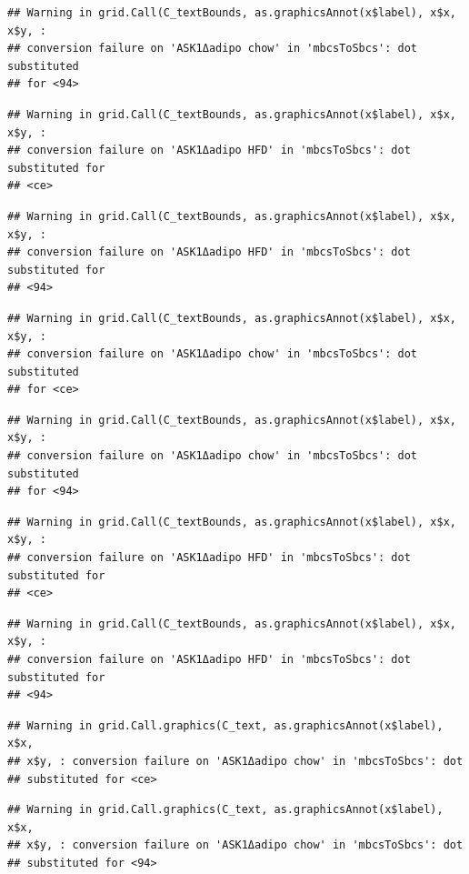 \documentclass[]{book}
\begin{document}
\begin{verbatim}
## Warning in grid.Call(C_textBounds, as.graphicsAnnot(x$label), x$x, x$y, :
## conversion failure on 'ASK1Δadipo chow' in 'mbcsToSbcs': dot substituted
## for <94>
\end{verbatim}

\begin{verbatim}
## Warning in grid.Call(C_textBounds, as.graphicsAnnot(x$label), x$x, x$y, :
## conversion failure on 'ASK1Δadipo HFD' in 'mbcsToSbcs': dot substituted for
## <ce>
\end{verbatim}

\begin{verbatim}
## Warning in grid.Call(C_textBounds, as.graphicsAnnot(x$label), x$x, x$y, :
## conversion failure on 'ASK1Δadipo HFD' in 'mbcsToSbcs': dot substituted for
## <94>
\end{verbatim}

\begin{verbatim}
## Warning in grid.Call(C_textBounds, as.graphicsAnnot(x$label), x$x, x$y, :
## conversion failure on 'ASK1Δadipo chow' in 'mbcsToSbcs': dot substituted
## for <ce>
\end{verbatim}

\begin{verbatim}
## Warning in grid.Call(C_textBounds, as.graphicsAnnot(x$label), x$x, x$y, :
## conversion failure on 'ASK1Δadipo chow' in 'mbcsToSbcs': dot substituted
## for <94>
\end{verbatim}

\begin{verbatim}
## Warning in grid.Call(C_textBounds, as.graphicsAnnot(x$label), x$x, x$y, :
## conversion failure on 'ASK1Δadipo HFD' in 'mbcsToSbcs': dot substituted for
## <ce>
\end{verbatim}

\begin{verbatim}
## Warning in grid.Call(C_textBounds, as.graphicsAnnot(x$label), x$x, x$y, :
## conversion failure on 'ASK1Δadipo HFD' in 'mbcsToSbcs': dot substituted for
## <94>
\end{verbatim}

\begin{verbatim}
## Warning in grid.Call.graphics(C_text, as.graphicsAnnot(x$label), x$x,
## x$y, : conversion failure on 'ASK1Δadipo chow' in 'mbcsToSbcs': dot
## substituted for <ce>
\end{verbatim}

\begin{verbatim}
## Warning in grid.Call.graphics(C_text, as.graphicsAnnot(x$label), x$x,
## x$y, : conversion failure on 'ASK1Δadipo chow' in 'mbcsToSbcs': dot
## substituted for <94>
\end{verbatim}
\end{document}
